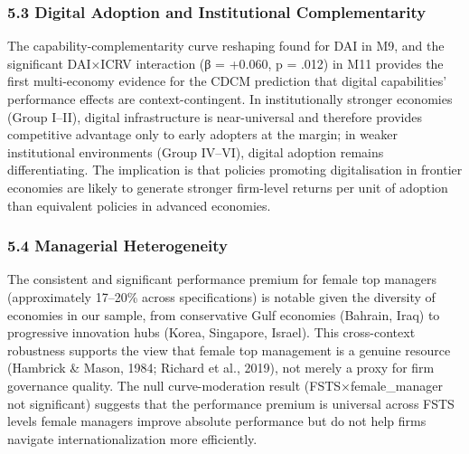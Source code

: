 \documentclass[
  12pt,a4paper]{article}
\begin{document}
\hypertarget{digital-adoption-and-institutional-complementarity}{%
\subsubsection{5.3 Digital Adoption and Institutional
Complementarity}\label{digital-adoption-and-institutional-complementarity}}

The capability-complementarity curve reshaping found for DAI in M9, and
the significant DAI×ICRV interaction (β = +0.060, p = .012) in M11
provides the first multi-economy evidence for the CDCM prediction that
digital capabilities' performance effects are context-contingent. In
institutionally stronger economies (Group I--II), digital infrastructure
is near-universal and therefore provides competitive advantage only to
early adopters at the margin; in weaker institutional environments
(Group IV--VI), digital adoption remains differentiating. The
implication is that policies promoting digitalisation in frontier
economies are likely to generate stronger firm-level returns per unit of
adoption than equivalent policies in advanced economies.

\hypertarget{managerial-heterogeneity}{%
\subsubsection{5.4 Managerial
Heterogeneity}\label{managerial-heterogeneity}}

The consistent and significant performance premium for female top
managers (approximately 17--20\% across specifications) is notable given
the diversity of economies in our sample, from conservative Gulf
economies (Bahrain, Iraq) to progressive innovation hubs (Korea,
Singapore, Israel). This cross-context robustness supports the view that
female top management is a genuine resource (Hambrick \& Mason, 1984;
Richard et al., 2019), not merely a proxy for firm governance quality.
The null curve-moderation result (FSTS×female\_manager not significant)
suggests that the performance premium is universal across FSTS levels
female managers improve absolute performance but do not help firms
navigate internationalization more efficiently.
\end{document}
